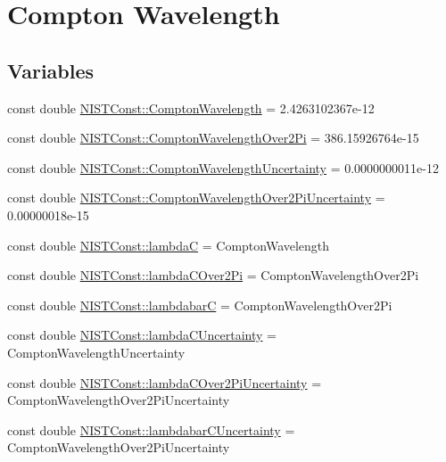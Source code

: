 \hypertarget{group___n_i_s_t_const-_compton_wavelength}{}\section{Compton Wavelength}
\label{group___n_i_s_t_const-_compton_wavelength}
\subsection*{Variables}
\begin{DoxyCompactItemize}
\item 
const double \hyperlink{group___n_i_s_t_const-_compton_wavelength_ga6f9b597d657bd3e9add13a76516cbabc}{N\+I\+S\+T\+Const\+::\+Compton\+Wavelength} = 2.\+4263102367e-\/12
\item 
const double \hyperlink{group___n_i_s_t_const-_compton_wavelength_ga5031f85750fecb545f0353cb05bb7c69}{N\+I\+S\+T\+Const\+::\+Compton\+Wavelength\+Over2\+Pi} = 386.\+15926764e-\/15
\item 
const double \hyperlink{group___n_i_s_t_const-_compton_wavelength_ga4845f956ea0bf6f4eaf7396173b09430}{N\+I\+S\+T\+Const\+::\+Compton\+Wavelength\+Uncertainty} = 0.\+0000000011e-\/12
\item 
const double \hyperlink{group___n_i_s_t_const-_compton_wavelength_ga900f59720b26696c75d2ce455d686a57}{N\+I\+S\+T\+Const\+::\+Compton\+Wavelength\+Over2\+Pi\+Uncertainty} = 0.\+00000018e-\/15
\item 
const double \hyperlink{group___n_i_s_t_const-_compton_wavelength_gae311e27b1f359b90efb6895ddf388a80}{N\+I\+S\+T\+Const\+::lambdaC} = Compton\+Wavelength
\item 
const double \hyperlink{group___n_i_s_t_const-_compton_wavelength_gadaf3906a9db23eece3ac4e130978a8ce}{N\+I\+S\+T\+Const\+::lambda\+C\+Over2\+Pi} = Compton\+Wavelength\+Over2\+Pi
\item 
const double \hyperlink{group___n_i_s_t_const-_compton_wavelength_gaeed48ca7330a4ba9227043237fed90f9}{N\+I\+S\+T\+Const\+::lambdabarC} = Compton\+Wavelength\+Over2\+Pi
\item 
const double \hyperlink{group___n_i_s_t_const-_compton_wavelength_ga5de8d927be86c65e9e7d78f2c399cc49}{N\+I\+S\+T\+Const\+::lambda\+C\+Uncertainty} = Compton\+Wavelength\+Uncertainty
\item 
const double \hyperlink{group___n_i_s_t_const-_compton_wavelength_ga6e5779d1afe643df1e5c28e97cfaf957}{N\+I\+S\+T\+Const\+::lambda\+C\+Over2\+Pi\+Uncertainty} = Compton\+Wavelength\+Over2\+Pi\+Uncertainty
\item 
const double \hyperlink{group___n_i_s_t_const-_compton_wavelength_ga56b8e49aa3ccbfb73a500f63c9fd3b05}{N\+I\+S\+T\+Const\+::lambdabar\+C\+Uncertainty} = Compton\+Wavelength\+Over2\+Pi\+Uncertainty
\end{DoxyCompactItemize}


